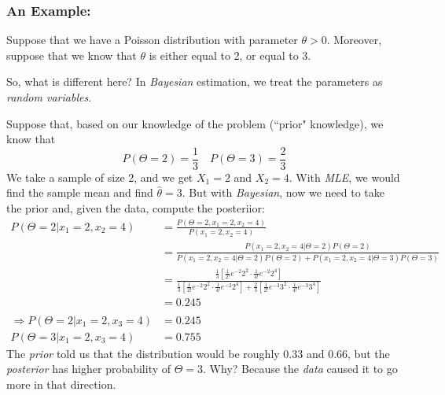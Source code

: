 \documentclass{article}
\begin{document}
\subsubsection{An Example:}

Suppose that we have a Poisson distribution with parameter $\theta > 0$. Moreover, suppose that we know that $\theta$ is either equal to 2, or equal to 3.

So, what is different here? In \textit{Bayesian} estimation, we treat the parameters as \textit{random variables}. 

Suppose that, based on our knowledge of the problem (``prior" knowledge), we know that
\begin{equation*}
    P(\Theta = 2) = \frac{1}{3} \quad P( \Theta = 3) = \frac{2}{3}
\end{equation*}
We take a sample of size 2, and we get $X_1 = 2$ and $X_2 = 4$. With \textit{MLE}, we would find the sample mean and find $\hat{\theta} = 3$. But with \textit{Bayesian}, now we need to take the prior and, given the data, compute the posteriior:
\begin{equation*}
    \begin{split}
        P(\Theta = 2 | x_1 = 2, x_2 = 4) &= \frac{P(\Theta = 2, x_1 = 2, x_2 = 4)}{P(x_1 = 2, x_2 = 4)}\\
        &= \frac{P(x_1 = 2, x_2 = 4|\Theta = 2) P(\Theta = 2)}{P(x_1 = 2, x_2 = 4|\Theta = 2) P(\Theta = 2) + P(x_1 = 2, x_2 = 4|\Theta = 3) P(\Theta = 3)}\\
        &= \frac{\frac{1}{3}\left[ \frac{1}{2!} e^{-2}2^2 \cdot \frac{1}{4!}e^{-2}2^4\right] }{\frac{1}{3}\left[ \frac{1}{2!} e^{-2}2^2 \cdot \frac{1}{4!}e^{-2}2^4\right]  + \frac{2}{3}\left[ \frac{1}{2!} e^{-3}3^2 \cdot \frac{1}{4!}e^{-3}3^4\right] }\\
        &= 0.245\\
        \\
        \Rightarrow P(\Theta = 2 | x_1 = 2, x_3 = 4) &= 0.245\\
        P(\Theta = 3 | x_1 = 2, x_3 = 4) &= 0.755
    \end{split}
\end{equation*}
The \textit{prior} told us that the distribution would be roughly $0.33$ and $0.66$, but the \textit{posterior} has higher probability of $\Theta = 3$. Why? Because the \textit{data} caused it to go more in that direction.
\end{document}
